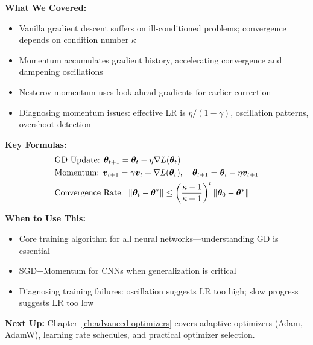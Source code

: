 \documentclass[../../main.tex]{subfiles}
\begin{document}
\begin{chaptersummary}
\textbf{What We Covered:}
\begin{itemize}
    \item Vanilla gradient descent suffers on ill-conditioned problems; convergence depends on condition number $\kappa$
    \item Momentum accumulates gradient history, accelerating convergence and dampening oscillations
    \item Nesterov momentum uses look-ahead gradients for earlier correction
    \item Diagnosing momentum issues: effective LR is $\eta/(1-\gamma)$, oscillation patterns, overshoot detection
\end{itemize}

\textbf{Key Formulas:}
\begin{align*}
    &\text{GD Update: } \boldsymbol{\theta}_{t+1} = \boldsymbol{\theta}_t - \eta \nabla L(\boldsymbol{\theta}_t) \\
    &\text{Momentum: } \boldsymbol{v}_{t+1} = \gamma \boldsymbol{v}_t + \nabla L(\boldsymbol{\theta}_t), \quad \boldsymbol{\theta}_{t+1} = \boldsymbol{\theta}_t - \eta \boldsymbol{v}_{t+1} \\
    &\text{Convergence Rate: } \left\lVert \boldsymbol{\theta}_t - \boldsymbol{\theta}^* \right\rVert \leq \left(\frac{\kappa - 1}{\kappa + 1}\right)^t \left\lVert \boldsymbol{\theta}_0 - \boldsymbol{\theta}^* \right\rVert
\end{align*}

\textbf{When to Use This:}
\begin{itemize}
    \item Core training algorithm for all neural networks---understanding GD is essential
    \item SGD+Momentum for CNNs when generalization is critical
    \item Diagnosing training failures: oscillation suggests LR too high; slow progress suggests LR too low
\end{itemize}

\textbf{Next Up:} Chapter~\ref{ch:advanced-optimizers} covers adaptive optimizers (Adam, AdamW), learning rate schedules, and practical optimizer selection.
\end{chaptersummary}
\end{document}
